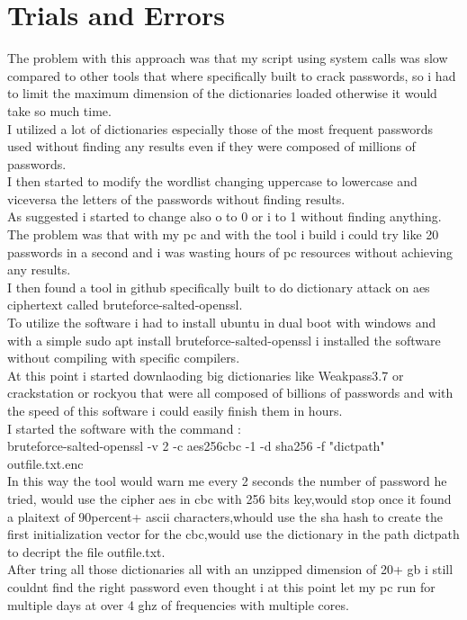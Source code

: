 \documentclass{article}
\begin{document}
\section{Trials and Errors}
The problem with this approach was that my script using system calls was slow compared to other tools that where specifically built to crack passwords, so i had to limit the maximum dimension of the dictionaries loaded otherwise it would take so much time.\\
I utilized a lot of dictionaries especially those of the most frequent passwords used without finding any results even if they were composed of millions of passwords.\\
I then started to modify the wordlist changing uppercase to lowercase and viceversa the letters of the passwords without finding results.\\
As suggested i started to change also o to 0 or i to 1 without finding anything.\\
The problem was that with my pc and with the tool i build i could try like 20 passwords in a second and i was wasting hours of pc resources without achieving any results.\\
I then found a tool in github specifically built to do dictionary attack on aes ciphertext called bruteforce-salted-openssl.\\
To utilize the software i had to install ubuntu in dual boot with windows and with a simple sudo apt install bruteforce-salted-openssl i installed the software without compiling with specific compilers.\\
At this point i started downlaoding big dictionaries like Weakpass3.7 or crackstation or rockyou that were all composed of billions of passwords and with the speed of this software i could easily finish them in hours.\\
I started the software with the command : \\
bruteforce-salted-openssl -v 2 -c aes256cbc -1 -d sha256 -f "dictpath" outfile.txt.enc\\
In this way the tool would warn me every 2 seconds the number of password he tried, would use the cipher aes in cbc with 256 bits key,would stop once it found a plaitext of 90percent+ ascii characters,whould use the sha hash to create the first initialization vector for the cbc,would use the dictionary in the path dictpath to decript the file outfile.txt.\\
After tring all those dictionaries all with an unzipped dimension of 20+ gb i still couldnt find the right password even thought i at this point let my pc run for multiple days at over 4 ghz of frequencies with multiple cores.
\end{document}
